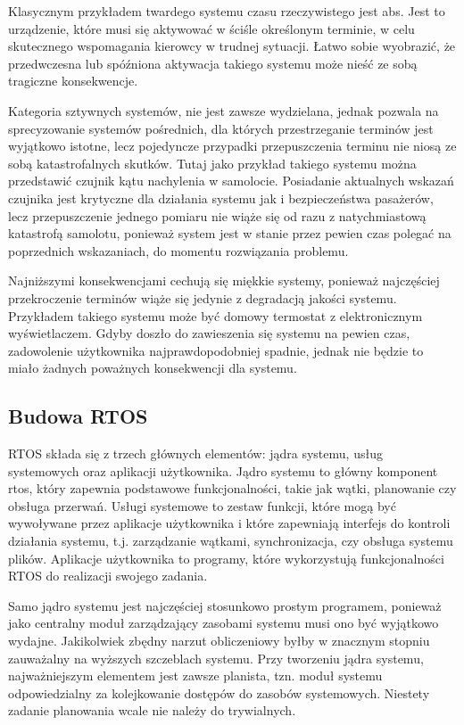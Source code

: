 Klasycznym przykładem twardego systemu czasu rzeczywistego jest \gls{abs}.
Jest to urządzenie, które musi się aktywować w ściśle określonym terminie, w celu skutecznego wspomagania kierowcy w trudnej sytuacji. Łatwo sobie wyobrazić,
że przedwczesna lub spóźniona aktywacja takiego systemu może nieść ze sobą tragiczne konsekwencje.

Kategoria sztywnych systemów, nie jest zawsze wydzielana, jednak pozwala na sprecyzowanie systemów pośrednich, dla których przestrzeganie terminów jest
wyjątkowo istotne, lecz pojedyncze przypadki przepuszczenia terminu nie niosą ze sobą katastrofalnych skutków. Tutaj jako przykład takiego systemu można
przedstawić czujnik kątu nachylenia w samolocie. Posiadanie aktualnych wskazań czujnika jest krytyczne dla działania systemu jak i bezpieczeństwa pasażerów,
lecz przepuszczenie jednego pomiaru nie wiąże się od razu z natychmiastową katastrofą samolotu, ponieważ system jest w stanie przez pewien czas polegać
na poprzednich wskazaniach, do momentu rozwiązania problemu.

Najniższymi konsekwencjami cechują się miękkie systemy, ponieważ najczęściej przekroczenie terminów wiąże się jedynie z degradacją jakości systemu.
Przykładem takiego systemu może być domowy termostat z elektronicznym wyświetlaczem. Gdyby doszło do zawieszenia się systemu na pewien czas,
zadowolenie użytkownika najprawdopodobniej spadnie, jednak nie będzie to miało żadnych poważnych konsekwencji dla systemu.

\subsection{Budowa RTOS}
RTOS składa się z trzech głównych elementów: jądra systemu, usług systemowych oraz aplikacji użytkownika\cite{freertosbook}.
Jądro systemu to główny komponent \gls{rtos}, który zapewnia podstawowe funkcjonalności, takie jak wątki, planowanie czy obsługa przerwań.
Usługi systemowe to zestaw funkcji, które mogą być wywoływane przez aplikacje użytkownika i które zapewniają interfejs do kontroli działania systemu,
t.j. zarządzanie wątkami, synchronizacja, czy obsługa systemu plików.
Aplikacje użytkownika to programy, które wykorzystują funkcjonalności RTOS do realizacji swojego zadania.

Samo jądro systemu jest najczęściej stosunkowo prostym programem, ponieważ jako centralny moduł zarządzający zasobami systemu musi ono być
wyjątkowo wydajne. Jakikolwiek zbędny narzut obliczeniowy byłby w znacznym stopniu zauważalny na wyższych szczeblach systemu.
Przy tworzeniu jądra systemu, najważniejszym elementem jest zawsze \gls{planista}, tzn. moduł systemu odpowiedzialny za kolejkowanie dostępów
do zasobów systemowych. Niestety zadanie planowania wcale nie należy do trywialnych.

